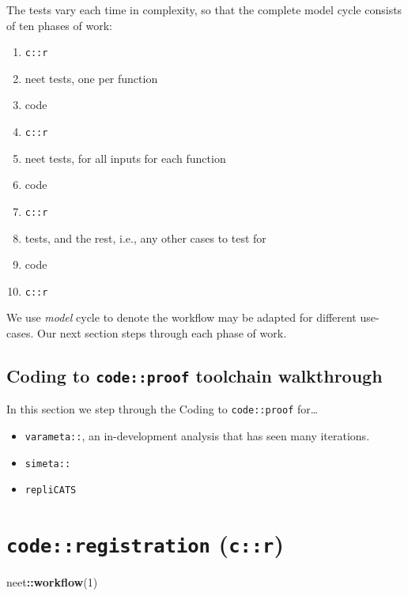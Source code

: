 \documentclass[
]{article}
\newenvironment{Shaded}{\begin{snugshade}}{\end{snugshade}}
\newcommand{\DecValTok}[1]{\textcolor[rgb]{0.00,0.00,0.81}{#1}}
\newcommand{\KeywordTok}[1]{\textcolor[rgb]{0.13,0.29,0.53}{\textbf{#1}}}
\newcommand{\NormalTok}[1]{#1}
\newcommand{\OperatorTok}[1]{\textcolor[rgb]{0.81,0.36,0.00}{\textbf{#1}}}
\providecommand{\tightlist}{%
  \setlength{\itemsep}{0pt}\setlength{\parskip}{0pt}}
\begin{document}
The tests vary each time in complexity, so that the complete model cycle
consists of ten phases of work:

\begin{enumerate}
\def\labelenumi{\arabic{enumi}.}
\tightlist
\item
  \texttt{c::r}
\item
  neet tests, one per function
\item
  code
\item
  \texttt{c::r}
\item
  neet tests, for all inputs for each function
\item
  code
\item
  \texttt{c::r}
\item
  tests, and the rest, i.e., any other cases to test for
\item
  code
\item
  \texttt{c::r}
\end{enumerate}

We use \emph{model} cycle to denote the workflow may be adapted for
different use-cases. Our next section steps through each phase of work.

\hypertarget{coding-to-codeproof-toolchain-walkthrough}{%
\subsection{\texorpdfstring{Coding to \texttt{code::proof} toolchain
walkthrough}{Coding to code::proof toolchain walkthrough}}\label{coding-to-codeproof-toolchain-walkthrough}}

In this section we step through the Coding to \texttt{code::proof}
for\ldots{}

\begin{itemize}
\tightlist
\item
  \texttt{varameta::}, an in-development analysis that has seen many
  iterations.\\
\item
  \texttt{simeta::}
\item
  \texttt{repliCATS}
\end{itemize}

\hypertarget{coderegistration-cr}{%
\section{\texorpdfstring{\texttt{code::registration}
(\texttt{c::r})}{code::registration (c::r)}}\label{coderegistration-cr}}

\begin{Shaded}
\begin{Highlighting}[]
\NormalTok{neet}\OperatorTok{::}\KeywordTok{workflow}\NormalTok{(}\DecValTok{1}\NormalTok{)}
\end{Highlighting}
\end{Shaded}
\end{document}
